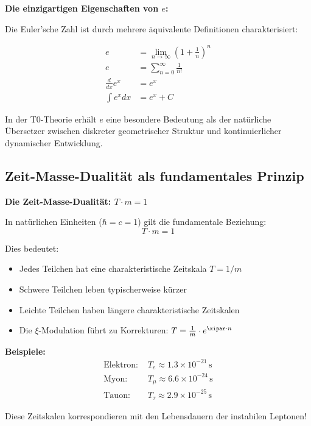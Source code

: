 	\begin{beziehung}
		\textbf{Die einzigartigen Eigenschaften von $e$:}
		
		Die Euler'sche Zahl ist durch mehrere äquivalente Definitionen charakterisiert:
		
		\begin{align}
			e &= \lim_{n \to \infty} \left(1 + \frac{1}{n}\right)^n \\
			e &= \sum_{n=0}^{\infty} \frac{1}{n!} \\
			\frac{d}{dx}e^x &= e^x \\
			\int e^x dx &= e^x + C
		\end{align}
		
		In der T0-Theorie erhält $e$ eine besondere Bedeutung als der natürliche Übersetzer zwischen diskreter geometrischer Struktur und kontinuierlicher dynamischer Entwicklung.
	\end{beziehung}
	
	\subsection{Zeit-Masse-Dualität als fundamentales Prinzip}
	
	\begin{erkenntnis}
		\textbf{Die Zeit-Masse-Dualität: $T \cdot m = 1$}
		
		In natürlichen Einheiten ($\hbar = c = 1$) gilt die fundamentale Beziehung:
		\begin{equation}
			\boxed{T \cdot m = 1}
		\end{equation}
		
		Dies bedeutet:
		\begin{itemize}
			\item Jedes Teilchen hat eine charakteristische Zeitskala $T = 1/m$
			\item Schwere Teilchen leben typischerweise kürzer
			\item Leichte Teilchen haben längere charakteristische Zeitskalen
			\item Die $\xi$-Modulation führt zu Korrekturen: $T = \frac{1}{m} \cdot e^{\xipar \cdot n}$
		\end{itemize}
		
		\textbf{Beispiele:}
		\begin{align}
			\text{Elektron: } & T_e \approx 1.3 \times 10^{-21}\, \text{s} \\
			\text{Myon: } & T_\mu \approx 6.6 \times 10^{-24}\, \text{s} \\
			\text{Tauon: } & T_\tau \approx 2.9 \times 10^{-25}\, \text{s}
		\end{align}
		
		Diese Zeitskalen korrespondieren mit den Lebensdauern der instabilen Leptonen!
	\end{erkenntnis}
	
